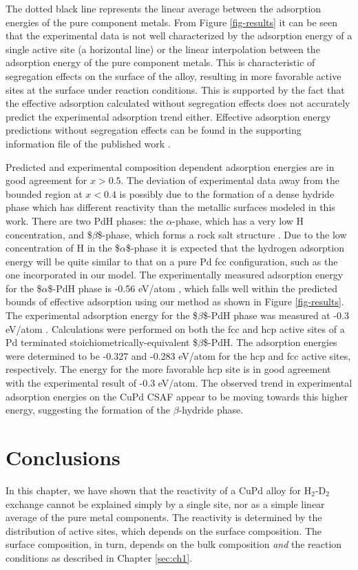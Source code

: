 \documentclass[12pt]{cmuthesis}
\begin{document}
The dotted black line represents the linear average between the adsorption energies of the pure component metals. From Figure \ref{fig-results} it can be seen that the experimental data is not well characterized by the adsorption energy of a single active site (a horizontal line) or the linear interpolation between the adsorption energy of the pure component metals. This is characteristic of segregation effects on the surface of the alloy, resulting in more favorable active sites at the surface under reaction conditions. This is supported by the fact that the effective adsorption calculated without segregation effects does not accurately predict the experimental adsorption trend either. Effective adsorption energy predictions without segregation effects can be found in the supporting information file of the published work \cite{boes-2015-estim-bulk}.

Predicted and experimental composition dependent adsorption energies are in good agreement for \(x > 0.5\). The deviation of experimental data away from the bounded region at \(x < 0.4\) is possibly due to the formation of a dense hydride phase which has different reactivity than the metallic surfaces modeled in this work. There are two PdH phases: the \(\alpha\)-phase, which has a very low H concentration, and \$\(\beta\)\$-phase, which forms a rock salt structure \cite{manchester-1994-h-pd}. Due to the low concentration of H in the \$\(\alpha\)\$-phase it is expected that the hydrogen adsorption energy will be quite similar to that on a pure Pd fcc configuration, such as the one incorporated in our model. The experimentally measured adsorption energy for the \$\(\alpha\)\$-PdH phase is -0.56 eV/atom \cite{obrien-2011-kinet-h}, which falls well within the predicted bounds of effective adsorption using our method as shown in Figure \ref{fig-results}. The experimental adsorption energy for the \$\(\beta\)\$-PdH phase was measured at -0.3 eV/atom \cite{obrien-2011-kinet-h}. Calculations were performed on both the fcc and hcp active sites of a Pd terminated stoichiometrically-equivalent \$\(\beta\)\$-PdH. The adsorption energies were determined to be -0.327 and -0.283 eV/atom for the hcp and fcc active sites, respectively. The energy for the more favorable hcp site is in good agreement with the experimental result of -0.3 eV/atom. The observed trend in experimental adsorption energies on the CuPd CSAF appear to be moving towards this higher energy, suggesting the formation of the \(\beta\)-hydride phase.

\section{Conclusions}
\label{sec:orge6af22c}
In this chapter, we have shown that the reactivity of a CuPd alloy for H\(_{\text{2}}\)-D\(_{\text{2}}\) exchange cannot be explained simply by a single site, nor as a simple linear average of the pure metal components. The reactivity is determined by the distribution of active sites, which depends on the surface composition. The surface composition, in turn, depends on the bulk composition \emph{and} the reaction conditions as described in Chapter \ref{sec:ch1}.
\end{document}
